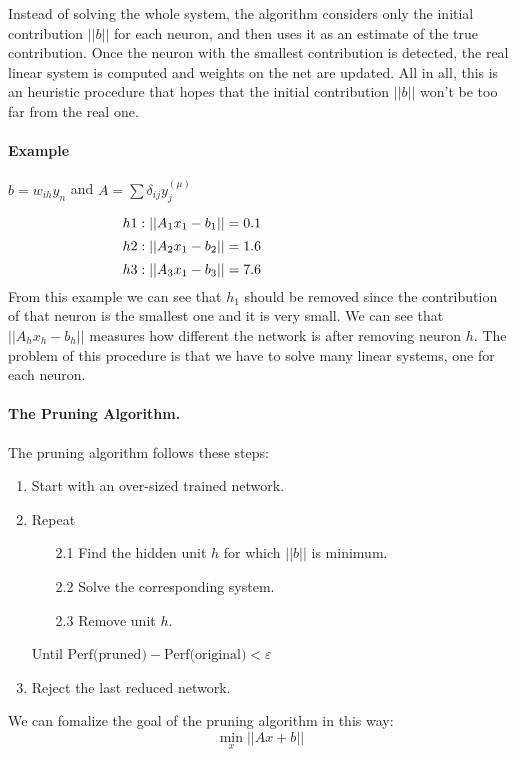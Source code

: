 Instead of solving the whole system, the algorithm considers only the initial contribution $||b||$ for each neuron, and then uses it as an estimate of the true contribution. Once the neuron with the smallest contribution is detected, the real linear system is computed and weights on the net are updated. All in all, this is an heuristic procedure that hopes that the initial contribution $||b||$ won't be too far from the real one.

\paragraph{Example} $b = w_{ih}y_n$ and $A= \sum\delta_{ij}y_j^{(\mu)}$

$$h1: \vert \vert A_1x_1 - b_1 \vert \vert  = 0.1 \hspace{9.7em} $$
$$h2: \vert \vert A_2x_1 - b_2 \vert \vert  = 1.6 \hspace{9.7em} $$
$$h3: \vert \vert A_3x_1 - b_3 \vert \vert  = 7.6 \hspace{9.7em} $$
From this example we can see that $h_1$ should be removed since the contribution of that neuron is the smallest one and it is very small. We can see that $ \vert \vert A_hx_h - b_h\vert \vert$ measures how different the network is after removing neuron $h$.
The problem of this procedure is that we have to solve many linear systems, one for each neuron.



\paragraph*{The Pruning Algorithm.}
The pruning algorithm follows these steps:
\begin{enumerate}
	\item Start with an over-sized trained network.
	\item Repeat
	\begin{enumerate}
		\item[2.1] Find the hidden unit $h$ for which $\vert \vert b \vert \vert$ is minimum.
		\item[2.2] Solve the corresponding system.
		\item[2.3] Remove unit $h$.
	\end{enumerate}
	Until $\text{Perf(pruned)} - \text{Perf(original)} < \varepsilon$
	\item Reject the last reduced network.
\end{enumerate}
We can fomalize the goal of the pruning algorithm in this way:
$$\min_x \vert\vert Ax + b \vert\vert$$


